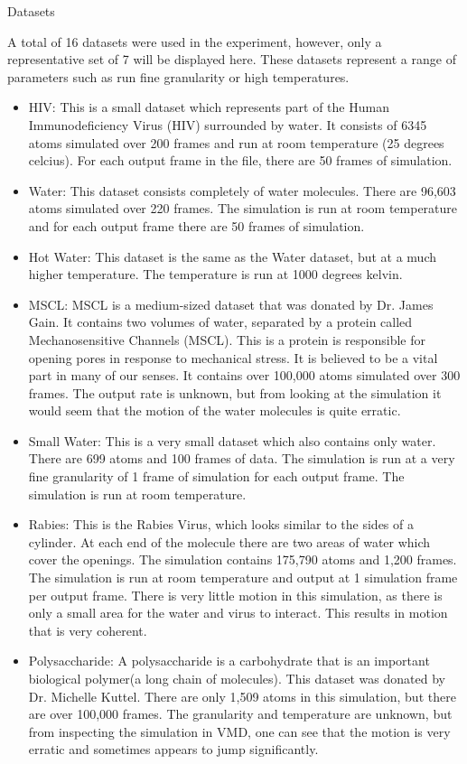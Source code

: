 \documentclass[a4paper,11pt]{report}
\begin{document}
\begin{section}{Datasets}

A total of 16 datasets were used in the experiment, however, only a representative set of 7 will be displayed here. These datasets represent a range of parameters such as run fine granularity or high temperatures. 

\begin{itemize}
 \item HIV: This is a small dataset which represents part of the Human Immunodeficiency Virus (HIV) surrounded by water. It consists of 6345 atoms simulated over 200 frames and run at room temperature (25 degrees celcius). For each output frame in the file, there are 50 frames of simulation.
 \item Water: This dataset consists completely of water molecules. There are 96,603 atoms simulated over 220 frames. The simulation is run at room temperature and for each output frame there are 50 frames of simulation.  
 \item Hot Water: This dataset is the same as the Water dataset, but at a much higher temperature. The temperature is run at 1000 degrees kelvin.
 \item MSCL: MSCL is a medium-sized dataset that was donated by Dr. James Gain. It contains two volumes of water, separated by a protein called Mechanosensitive Channels (MSCL). This is a protein is responsible for opening pores in response to mechanical stress. It is believed to be a vital part in many of our senses. It contains over 100,000 atoms simulated over 300 frames. The output rate is unknown, but from looking at the simulation it would seem that the motion of the water molecules is quite erratic.
 \item Small Water: This is a very small dataset which also contains only water. There are 699 atoms and 100 frames of data. The simulation is run at a very fine granularity of 1 frame of simulation for each output frame. The simulation is run at room temperature.
 \item Rabies: This is the Rabies Virus, which looks similar to the sides of a cylinder. At each end of the molecule there are two areas of water which cover the openings. The simulation contains 175,790 atoms and 1,200 frames. The simulation is run at room temperature and output at 1 simulation frame per output frame. There is very little motion in this simulation, as there is only a small area for the water and virus to interact. This results in motion that is very coherent.
 \item Polysaccharide: A polysaccharide is a carbohydrate that is an important biological polymer(a long chain of molecules). This dataset was donated by Dr. Michelle Kuttel. There are only 1,509 atoms in this simulation, but there are over 100,000 frames. The granularity and temperature are unknown, but from inspecting the simulation in VMD, one can see that the motion is very erratic and sometimes appears to jump significantly.
\end{itemize}


\end{section}
\end{document}
